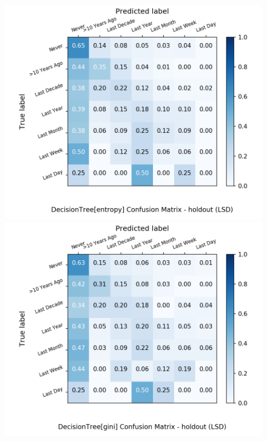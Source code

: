 \begin{figure}[H]
	\centering
	\begin{minipage}[b]{0.32\textwidth}
		\includegraphics[width=1.1\textwidth]{Plots/drugs/LSD_DecisionTree_entropy_balance_False_holdout.png}
	\end{minipage}
	\begin{minipage}[b]{0.32\textwidth}
		\includegraphics[width=1.1\textwidth]{Plots/drugs/LSD_DecisionTree_gini_balance_False_holdout.png}
	\end{minipage}
	\begin{minipage}[b]{0.32\textwidth}

\end{minipage}
\end{figure}
